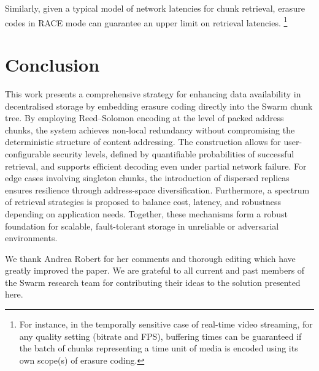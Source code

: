 \documentclass[manuscript,screen,review]{acmart}
\begin{document}
Similarly, given a typical model of network latencies for chunk retrieval, erasure codes in \textsc{RACE} mode can guarantee an upper limit on retrieval latencies.%
%
\footnote{For instance, in the temporally sensitive case of real-time video streaming, for any quality setting (bitrate and FPS), buffering times can be guaranteed if the batch of chunks representing a time unit of media is encoded using its own scope(s) of erasure coding.}


\section{Conclusion}\label{sec:conclusion}

This work presents a comprehensive strategy for enhancing data availability in decentralised storage by embedding erasure coding directly into the Swarm chunk tree. By employing Reed–Solomon encoding at the level of packed address chunks, the system achieves non-local redundancy without compromising the deterministic structure of content addressing. The construction allows for user-configurable security levels, defined by quantifiable probabilities of successful retrieval, and supports efficient decoding even under partial network failure. For edge cases involving singleton chunks, the introduction of dispersed replicas ensures resilience through address-space diversification. Furthermore, a spectrum of retrieval strategies is proposed to balance cost, latency, and robustness depending on application needs. Together, these mechanisms form a robust foundation for scalable, fault-tolerant storage in unreliable or adversarial environments.

\begin{acks}
We thank Andrea Robert for her comments and thorough editing which have greatly improved the paper. We are grateful to all current and past members of the Swarm research team for contributing their ideas to the solution presented here.
\end{acks}





\end{document}
